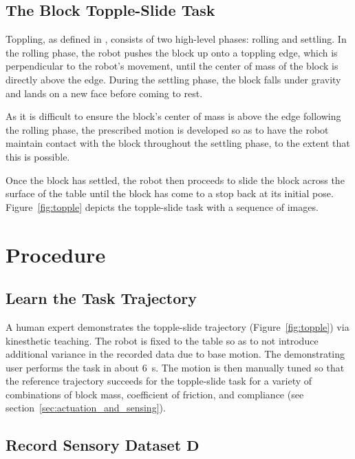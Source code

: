\subsection{The Block Topple-Slide Task}

Toppling, as defined in \cite{Lynch1999}, consists of two high-level phases: rolling and settling.
In the rolling phase, the robot pushes the block up onto a toppling edge, which is perpendicular to the robot's movement, until the center of mass of the block is directly above the edge.
During the settling phase, the block falls under gravity and lands on a new face before coming to rest.

As it is difficult to ensure the block's center of mass is above the edge following the rolling phase, the prescribed motion is developed so as to have the robot maintain contact with the block throughout the settling phase, to the extent that this is possible.

Once the block has settled, the robot then proceeds to slide the block across the surface of the table until the block has come to a stop back at its initial pose.
Figure~\ref{fig:topple} depicts the topple-slide task with a sequence of images.

\section{Procedure}


\subsection{Learn the Task Trajectory}

A human expert demonstrates the topple-slide trajectory (Figure~\ref{fig:topple}) via kinesthetic teaching.
The robot is fixed to the table so as to not introduce additional variance in the recorded data due to base motion.
The demonstrating user performs the task in about 6~s.  
The motion is then manually tuned so that the reference trajectory succeeds for the topple-slide task for a variety of combinations of block mass, coefficient of friction, and compliance (see section~\ref{sec:actuation_and_sensing}).

\subsection{Record Sensory Dataset $\mathbf{D}$}
\label{sec:preprocess}

